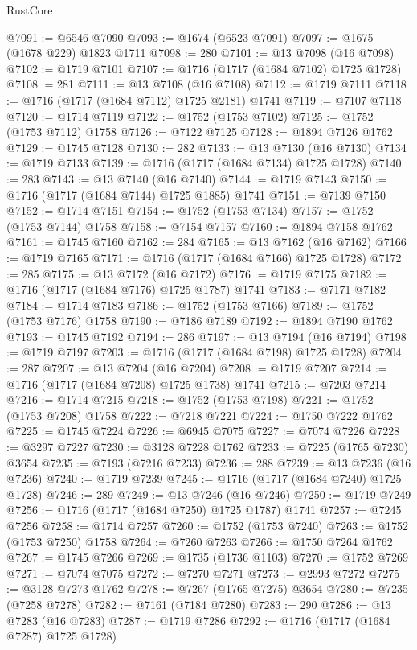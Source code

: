 \begin{lexlean}{RustCore}
\begin{coremodule}
@7091 := @6546 @7090
@7093 := @1674 (@6523 @7091)
@7097 := @1675 (@1678 @229) @1823 @1711
@7098 := 280
@7101 := @13 @7098 (@16 @7098)
@7102 := @1719 @7101
@7107 := @1716 (@1717 (@1684 @7102) @1725 @1728)
@7108 := 281
@7111 := @13 @7108 (@16 @7108)
@7112 := @1719 @7111
@7118 := @1716 (@1717 (@1684 @7112) @1725 @2181) @1741
@7119 := @7107 @7118
@7120 := @1714 @7119
@7122 := @1752 (@1753 @7102)
@7125 := @1752 (@1753 @7112) @1758
@7126 := @7122 @7125
@7128 := @1894 @7126 @1762
@7129 := @1745 @7128
@7130 := 282
@7133 := @13 @7130 (@16 @7130)
@7134 := @1719 @7133
@7139 := @1716 (@1717 (@1684 @7134) @1725 @1728)
@7140 := 283
@7143 := @13 @7140 (@16 @7140)
@7144 := @1719 @7143
@7150 := @1716 (@1717 (@1684 @7144) @1725 @1885) @1741
@7151 := @7139 @7150
@7152 := @1714 @7151
@7154 := @1752 (@1753 @7134)
@7157 := @1752 (@1753 @7144) @1758
@7158 := @7154 @7157
@7160 := @1894 @7158 @1762
@7161 := @1745 @7160
@7162 := 284
@7165 := @13 @7162 (@16 @7162)
@7166 := @1719 @7165
@7171 := @1716 (@1717 (@1684 @7166) @1725 @1728)
@7172 := 285
@7175 := @13 @7172 (@16 @7172)
@7176 := @1719 @7175
@7182 := @1716 (@1717 (@1684 @7176) @1725 @1787) @1741
@7183 := @7171 @7182
@7184 := @1714 @7183
@7186 := @1752 (@1753 @7166)
@7189 := @1752 (@1753 @7176) @1758
@7190 := @7186 @7189
@7192 := @1894 @7190 @1762
@7193 := @1745 @7192
@7194 := 286
@7197 := @13 @7194 (@16 @7194)
@7198 := @1719 @7197
@7203 := @1716 (@1717 (@1684 @7198) @1725 @1728)
@7204 := 287
@7207 := @13 @7204 (@16 @7204)
@7208 := @1719 @7207
@7214 := @1716 (@1717 (@1684 @7208) @1725 @1738) @1741
@7215 := @7203 @7214
@7216 := @1714 @7215
@7218 := @1752 (@1753 @7198)
@7221 := @1752 (@1753 @7208) @1758
@7222 := @7218 @7221
@7224 := @1750 @7222 @1762
@7225 := @1745 @7224
@7226 := @6945 @7075
@7227 := @7074 @7226
@7228 := @3297 @7227
@7230 := @3128 @7228 @1762
@7233 := @7225 (@1765 @7230) @3654
@7235 := @7193 (@7216 @7233)
@7236 := 288
@7239 := @13 @7236 (@16 @7236)
@7240 := @1719 @7239
@7245 := @1716 (@1717 (@1684 @7240) @1725 @1728)
@7246 := 289
@7249 := @13 @7246 (@16 @7246)
@7250 := @1719 @7249
@7256 := @1716 (@1717 (@1684 @7250) @1725 @1787) @1741
@7257 := @7245 @7256
@7258 := @1714 @7257
@7260 := @1752 (@1753 @7240)
@7263 := @1752 (@1753 @7250) @1758
@7264 := @7260 @7263
@7266 := @1750 @7264 @1762
@7267 := @1745 @7266
@7269 := @1735 (@1736 @1103)
@7270 := @1752 @7269
@7271 := @7074 @7075
@7272 := @7270 @7271
@7273 := @2993 @7272
@7275 := @3128 @7273 @1762
@7278 := @7267 (@1765 @7275) @3654
@7280 := @7235 (@7258 @7278)
@7282 := @7161 (@7184 @7280)
@7283 := 290
@7286 := @13 @7283 (@16 @7283)
@7287 := @1719 @7286
@7292 := @1716 (@1717 (@1684 @7287) @1725 @1728)

\end{coremodule}
\end{lexlean}
